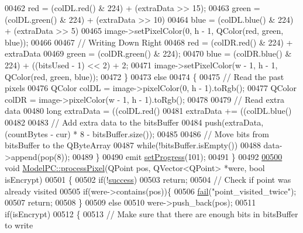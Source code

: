 \begin{DoxyCode}
00462         red = (colDL.red() & 224) + (extraData >> 15);
00463         green = (colDL.green() & 224) + (extraData >> 10) %
00464         blue = (colDL.blue() & 224) + (extraData >> 5) %
00465         image->setPixelColor(0, h - 1, QColor(red, green, blue));
00466 
00467         \textcolor{comment}{// Writing Down Right}
00468         red = (colDR.red() & 224) + extraData %
00469         green = (colDR.green() & 224);
00470         blue = (colDR.blue() & 224) + ((bitsUsed - 1) << 2) + 2;
00471         image->setPixelColor(w - 1, h - 1, QColor(red, green, blue));
00472     \}
00473     \textcolor{keywordflow}{else}
00474     \{
00475         \textcolor{comment}{// Read the past pixels}
00476         QColor colDL = image->pixelColor(0, h - 1).toRgb();
00477         QColor colDR = image->pixelColor(w - 1, h - 1).toRgb();
00478 
00479         \textcolor{comment}{// Read extra data}
00480         \textcolor{keywordtype}{long} extraData = ((colDL.red() %
00481         extraData += ((colDL.blue() %
00482 
00483         \textcolor{comment}{// Add extra data to the bitsBuffer}
00484         push(extraData, (countBytes - cur) * 8 - bitsBuffer.size());
00485 
00486         \textcolor{comment}{// Move bits from bitsBuffer to the QByteArray}
00487         \textcolor{keywordflow}{while}(!bitsBuffer.isEmpty())
00488             data->append(pop(8));
00489     \}
00490     emit \hyperlink{class_model_p_c_afdcd80f0ed5062e145a71f09b0897547}{setProgress}(101);
00491 \}
00492 
\hypertarget{modelpc_8cpp_source.tex_l00500}{}\hyperlink{class_model_p_c_a1171f9fe1550133dc9053a46b4e5bcfd}{00500} \textcolor{keywordtype}{void} \hyperlink{class_model_p_c_a1171f9fe1550133dc9053a46b4e5bcfd}{ModelPC::processPixel}(QPoint pos, QVector<QPoint> *were, \textcolor{keywordtype}{bool} isEncrypt)
00501 \{
00502     \textcolor{keywordflow}{if}(!\hyperlink{class_model_p_c_a945ffbbc44a832b953c191debd448f4c}{success})
00503         \textcolor{keywordflow}{return};
00504     \textcolor{comment}{// Check if point was already visited}
00505     \textcolor{keywordflow}{if}(were->contains(pos))\{
00506         \hyperlink{class_model_p_c_a47464b59b7e37fcee25e55475708aabd}{fail}(\textcolor{stringliteral}{"point\_visited\_twice"});
00507         \textcolor{keywordflow}{return};
00508     \}
00509     \textcolor{keywordflow}{else}
00510         were->push\_back(pos);
00511     \textcolor{keywordflow}{if}(isEncrypt)
00512     \{
00513         \textcolor{comment}{// Make sure that there are enough bits in bitsBuffer to write}

\end{DoxyCode}
